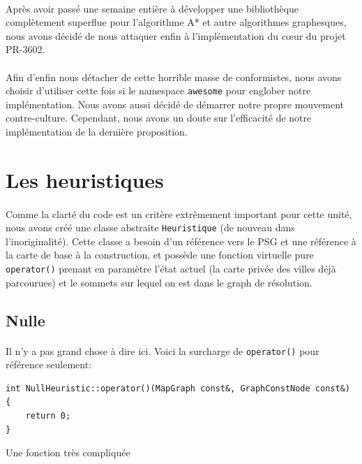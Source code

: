 \documentclass[french]{article}
\begin{document}
\paragraph{} Après avoir passé une semaine entière à développer une
bibliothèque complètement superflue pour l'algorithme A* et autre algorithmes
graphesques, nous avons décidé de nous attaquer enfin à l'implémentation du
cœur du projet PR-3602.

\paragraph{} Afin d'enfin nous détacher de cette horrible masse de
conformistes, nous avons choisir d'utiliser cette fois si le namespace
\texttt{awesome} pour englober notre implémentation. Nous avons aussi décidé de
démarrer notre propre mouvement contre-culture. Cependant, nous avons un doute
sur l'efficacité de notre implémentation de la dernière proposition.

\section{Les heuristiques}

\paragraph{} Comme la clarté du code est un critère extrêmement important pour
cette unité, nous avons créé une classe abstraite \texttt{Heuristique} (de
nouveau dans l'inoriginalité). Cette classe a besoin d'un référence vers le PSG
et une référence à la carte de base à la construction, et possède une fonction
virtuelle pure \texttt{operator()} prenant en paramètre l'état actuel
(la carte privée des villes déjà parcourues) et le sommets sur lequel on est
dans le graph de résolution.

\subsection{Nulle}

\paragraph{} Il n'y a pas grand chose à dire ici. Voici la surcharge de
\texttt{operator()} pour référence seulement:

\begin{listing}[H]
\begin{verbatim}
int NullHeuristic::operator()(MapGraph const&, GraphConstNode const&) {
	return 0;
}
\end{verbatim}
\caption{Une fonction très compliquée}
\label{tsp:nulloperator}
\end{listing}
\end{document}

